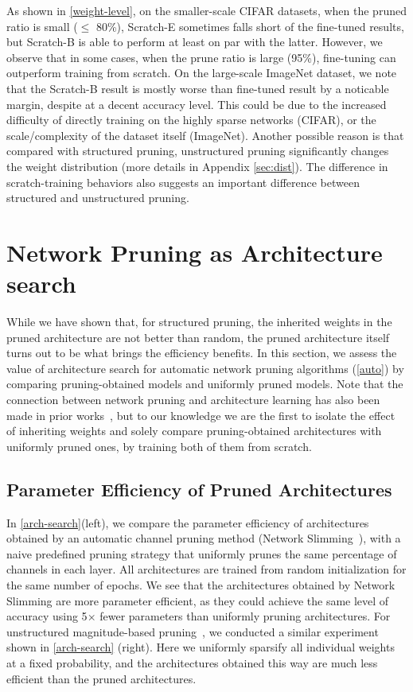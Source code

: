 As shown in \autoref{weight-level}, on the smaller-scale CIFAR datasets, when the pruned ratio is small ($\le$ 80\%), 
Scratch-E sometimes falls short of the fine-tuned results, but Scratch-B is able to perform at least on par with the latter. However, we observe that in some cases, when the prune ratio is large (95\%), fine-tuning can outperform training from scratch. 
On the large-scale ImageNet dataset, we note that the Scratch-B result is mostly worse than fine-tuned result by a noticable margin, despite at a decent accuracy level. 
 This could be due to the increased difficulty of directly training on the highly sparse networks (CIFAR), or the scale/complexity of the dataset itself (ImageNet). Another possible reason is that compared with structured pruning, unstructured pruning significantly changes the weight distribution (more details in Appendix \ref{sec:dist}). The difference in scratch-training behaviors also suggests an important difference between structured and unstructured pruning.

\section{Network Pruning as Architecture search}
\label{sec:arch}

While we have shown that, for structured pruning, the inherited weights in the pruned architecture are not better than random, the pruned architecture itself turns out to be what brings the efficiency benefits. 
In this section, we assess the value of architecture search for automatic network pruning algorithms (\autoref{auto}) by comparing pruning-obtained models and uniformly pruned models. Note that the connection between network pruning and architecture learning has also been made in prior works~\cite{han2015learning,liu2017learning,gordon2018morphnet,huang2018condensenet}, but to our knowledge we are the first to isolate the effect of inheriting weights and solely compare pruning-obtained architectures with uniformly pruned ones, by training both of them from scratch.


\subsection{Parameter Efficiency of Pruned Architectures}
In \autoref{arch-search}(left), we compare the parameter efficiency of architectures obtained by an automatic channel pruning method (Network Slimming~\cite{liu2017learning}),  with a naive predefined pruning strategy that uniformly prunes the same percentage of channels in each layer. All architectures are trained from random initialization for the same number of epochs. We see that the architectures obtained by Network Slimming are more parameter efficient, as they could achieve the same level of accuracy using 5$\times$ fewer parameters than uniformly pruning architectures. 
For unstructured magnitude-based pruning~\cite{han2015learning}, we conducted a similar experiment shown in \autoref{arch-search} (right). Here we uniformly sparsify all individual weights at a fixed probability, and the architectures obtained this way are much less efficient than the pruned architectures. 

